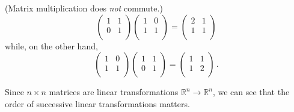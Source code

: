 \begin{example} (Matrix multiplication does \emph{not} commute.)
\[
\begin{pmatrix}
1 & 1 \\
0 & 1 \\
\end{pmatrix}
\begin{pmatrix}
1 & 0 \\
1 & 1 \\
\end{pmatrix} =
\begin{pmatrix}
2 & 1 \\
1 & 1 \\
\end{pmatrix}
\]
while, on the other hand,
\[
\begin{pmatrix}
1 & 0 \\
1 & 1 \\
\end{pmatrix}
\begin{pmatrix}
1 & 1 \\
0 & 1 \\
\end{pmatrix} =
\begin{pmatrix}
1 & 1 \\
1 & 2 \\
\end{pmatrix}\, .
\]
\end{example}
Since $n\times n$ matrices are linear transformations $\mathbb{R}^n \rightarrow \mathbb{R}^n$, we can see that the order of successive linear transformations matters.  

